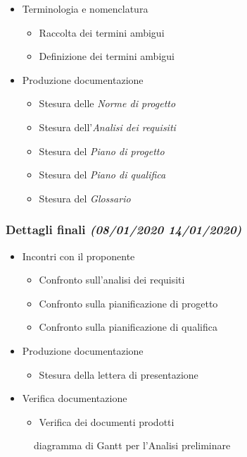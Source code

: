 \documentclass[../piano-di-progetto.tex]{subfiles}
\begin{document}
\begin{itemize}
\begin{itemize}
  \end{itemize}
  \item Terminologia e nomenclatura
  \begin{itemize}
    \item Raccolta dei termini ambigui
    \item Definizione dei termini ambigui
  \end{itemize}
  \item Produzione documentazione
  \begin{itemize}
    \item Stesura delle \textit{Norme di progetto}
    \item Stesura dell'\textit{Analisi dei requisiti}
    \item Stesura del \textit{Piano di progetto}
    \item Stesura del \textit{Piano di qualifica}
    \item Stesura del \textit{Glossario}
  \end{itemize}
\end{itemize}
\subsubsection[Dettagli finali]{Dettagli finali {\normalsize\normalfont\itshape(08/01/2020  14/01/2020)}}%
\label{subs:dettagli_finali}
\begin{itemize}
  \item Incontri con il proponente
  \begin{itemize}
    \item Confronto sull'analisi dei requisiti
    \item Confronto sulla pianificazione di progetto
    \item Confronto sulla pianificazione di qualifica
  \end{itemize}
  \item Produzione documentazione
  \begin{itemize}
    \item Stesura della lettera di presentazione
  \end{itemize}
  \item Verifica documentazione
  \begin{itemize}
    \item Verifica dei documenti prodotti
  \end{itemize}
\end{itemize}
\begin{figure}[h]
  \centering
  
  \caption{diagramma di Gantt per l'Analisi preliminare}
  \label{fig:gantt_analisi_preliminare}
\end{figure}
\end{document}
